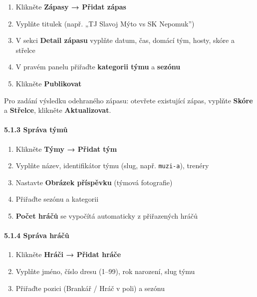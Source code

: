 \begin{enumerate}
\def\labelenumi{\arabic{enumi}.}
\tightlist
\item
  Klikněte \textbf{Zápasy → Přidat zápas}
\item
  Vyplňte titulek (např. „TJ Slavoj Mýto vs SK Nepomuk'')
\item
  V sekci \textbf{Detail zápasu} vyplňte datum, čas, domácí tým, hosty,
  skóre a střelce
\item
  V pravém panelu přiřaďte \textbf{kategorii týmu} a \textbf{sezónu}
\item
  Klikněte \textbf{Publikovat}
\end{enumerate}

Pro zadání výsledku odehraného zápasu: otevřete existující zápas,
vyplňte \textbf{Skóre} a \textbf{Střelce}, klikněte
\textbf{Aktualizovat}.

\paragraph{5.1.3 Správa týmů}\label{spruxe1va-tuxfdmux16f}

\begin{enumerate}
\def\labelenumi{\arabic{enumi}.}
\tightlist
\item
  Klikněte \textbf{Týmy → Přidat tým}
\item
  Vyplňte název, identifikátor týmu (slug, např. \texttt{muzi-a}),
  trenéry
\item
  Nastavte \textbf{Obrázek příspěvku} (týmová fotografie)
\item
  Přiřaďte sezónu a kategorii
\item
  \textbf{Počet hráčů} se vypočítá automaticky z přiřazených hráčů
\end{enumerate}

\paragraph{5.1.4 Správa hráčů}\label{spruxe1va-hruxe1ux10dux16f}

\begin{enumerate}
\def\labelenumi{\arabic{enumi}.}
\tightlist
\item
  Klikněte \textbf{Hráči → Přidat hráče}
\item
  Vyplňte jméno, číslo dresu (1--99), rok narození, slug týmu
\item
  Přiřaďte pozici (Brankář / Hráč v poli) a sezónu
\end{enumerate}

